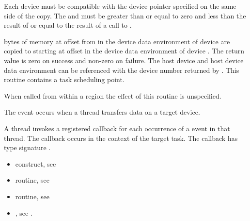 \begin{ccppspecific}
\constraints
Each device must
be compatible with the device pointer specified on the same side of the copy.
The  and 
must be greater than or equal to zero and less than the result of
 or equal to the result of a call to
.

\effect


 bytes of memory at offset  from  
in the device data environment of device  are
copied to  starting at offset  in the device data
environment of device .  
The return value is zero on success and non-zero on failure.  The host device
and host device data environment can be referenced with the device number
returned by . This routine contains a task
scheduling point.

When called from within a  region 
the effect of this routine is unspecified.

\events
The  event occurs when a thread transfers data on a target device.

\pagebreak
{}
\tools
A thread invokes a registered 
callback for each occurrence of a  event in that thread. 
The callback occurs in the context of the target task.  The callback has type signature
. 


\crossreferences
\begin{itemize}
\item {} construct, see 

\item {} routine, see 

\item {} routine, see 


\item {}, see 
.
\end{itemize}


\vspace{-1\baselineskip}
\subsection{}
\label{subsec:omp_target_memcpy_rect}
\summary


\end{ccppspecific}

